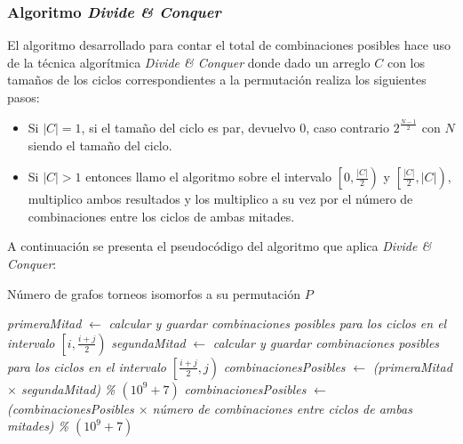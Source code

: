 \subsubsection{Algoritmo \emph{Divide \& Conquer}}

El algoritmo desarrollado para contar el total de combinaciones posibles hace
uso de la técnica algorítmica \emph{Divide \& Conquer} donde dado un arreglo $C$ con
los tamaños de los ciclos correspondientes a la permutación realiza los
siguientes pasos:

\begin{itemize}
	\item Si $|C| = 1$, si el tamaño del ciclo es par, devuelvo 0, caso contrario
    $2^{\frac{N -1}{2}}$ con $N$ siendo el tamaño del ciclo.
    \item Si $|C| > 1$ entonces llamo el algoritmo sobre el intervalo $\left[0,
    \frac{|C|}{2} \right)$ y $\left[\frac{|C|}{2}, |C| \right)$, multiplico
    ambos resultados y los multiplico a su vez por el número de combinaciones
    entre los ciclos de ambas mitades.
\end{itemize}

A continuación se presenta el pseudocódigo del algoritmo que aplica \emph{Divide
\& Conquer}:

\begin{algorithm}[H]
    \caption{Número de grafos torneos isomorfos a su permutación $P$}

     {
         \;
    }
    {
         {
             \;
        }
        {
            \emph{primeraMitad} $\gets$
                \emph{calcular y guardar combinaciones posibles para los ciclos
                en el intervalo $\left[ i, \frac{i + j}{2} \right)$} \;
            \emph{segundaMitad} $\gets$
                \emph{calcular y guardar combinaciones posibles para los ciclos
                en el intervalo $\left[ \frac{i + j}{2}, j \right)$} \;
            \emph{combinacionesPosibles} $\gets$
                \emph{(primeraMitad $\times$ segundaMitad)
                \% $(10^9 + 7)$} \;
            \emph{combinacionesPosibles} $\gets$
                \emph{(combinacionesPosibles $\times$
                número de combinaciones entre ciclos de ambas mitades)
                \% $(10^9 + 7)$} \;

             \;
        }
    }
\end{algorithm}

